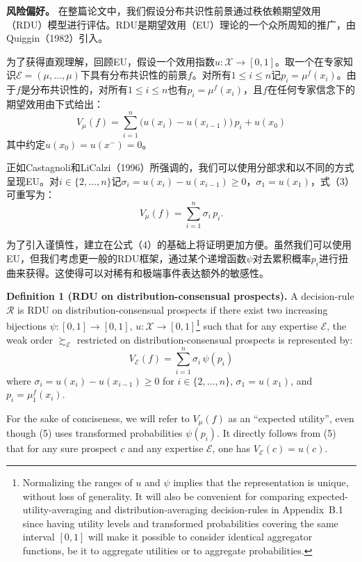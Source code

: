 \documentclass[12pt,a4paper]{article}
\newenvironment{original}
  {\par\noindent\ignorespaces}
  {\par}
\newenvironment{translation}
  {\par\noindent{\color{transblue}\ignorespaces}}
  {\par\medskip}
\begin{document}
\begin{translation}
\textbf{风险偏好。} 在整篇论文中，我们假设分布共识性前景通过秩依赖期望效用（RDU）模型进行评估。RDU是期望效用（EU）理论的一个众所周知的推广，由Quiggin（1982）引入。

为了获得直观理解，回顾EU，假设一个效用指数$u: \mathcal{X} \to [0,1]$。取一个在专家知识$\mathcal{E} = (\mu, \dots, \mu)$下具有分布共识性的前景$f$。对所有$1 \leq i \leq n$记$p_{i} = \mu^{f}(x_{i})$。由于$f$是分布共识性的，对所有$1 \leq i \leq n$也有$p_{i} = \mu^{f}(x_{i})$，且$f$在任何专家信念下的期望效用由下式给出：
\[
V_{\mu}(f) = \sum_{i=1}^{n} \big(u(x_{i}) - u(x_{i-1})\big) \, p_{i} + u(x_{0}) \tag{3}
\]
其中约定$u(x_{0}) = u(x^{-}) = 0$。

正如Castagnoli和LiCalzi（1996）所强调的，我们可以使用分部求和以不同的方式呈现EU。对$i \in \{2, \dots, n\}$记$\sigma_{i} = u(x_{i}) - u(x_{i-1}) \geq 0$，$\sigma_{1} = u(x_{1})$，式（3）可重写为：
\[
V_{\mu}(f) = \sum_{i=1}^{n} \sigma_{i} \, p_{i}. \tag{4}
\]

为了引入谨慎性，建立在公式（4）的基础上将证明更加方便。虽然我们可以使用EU，但我们考虑更一般的RDU框架，通过某个递增函数$\psi$对去累积概率$p_{i}$进行扭曲来获得。这使得可以对稀有和极端事件表达额外的敏感性。
\end{translation}

\begin{original}
\textbf{Definition 1 (RDU on distribution-consensual prospects).} A decision-rule $\mathcal{R}$ is RDU on distribution-consensual prospects if there exist two increasing bijections $\psi: [0,1] \to [0,1]$, $u: \mathcal{X} \to [0,1]$\footnote{Normalizing the ranges of $u$ and $\psi$ implies that the representation is unique, without loss of generality. It will also be convenient for comparing expected-utility-averaging and distribution-averaging decision-rules in Appendix~B.1 since having utility levels and transformed probabilities covering the same interval $[0,1]$ will make it possible to consider identical aggregator functions, be it to aggregate utilities or to aggregate probabilities.} such that for any expertise $\mathcal{E}$, the weak order $\succsim_{\mathcal{E}}$ restricted on distribution-consensual prospects is represented by:
\[
V_{\mathcal{E}}(f) = \sum_{i=1}^{n} \sigma_{i} \, \psi(p_{i}) \tag{5}
\]
where $\sigma_{i} = u(x_{i}) - u(x_{i-1}) \geq 0$ for $i \in \{2, \dots, n\}$, $\sigma_{1} = u(x_{1})$, and $p_{i} = \mu_{1}^{f}(x_{i})$.

For the sake of conciseness, we will refer to $V_{\mu}(f)$ as an ``expected utility'', even though (5) uses transformed probabilities $\psi(p_{i})$. It directly follows from (5) that for any sure prospect $c$ and any expertise $\mathcal{E}$, one has $V_{\mathcal{E}}(c) = u(c)$.
\end{original}
\end{document}
